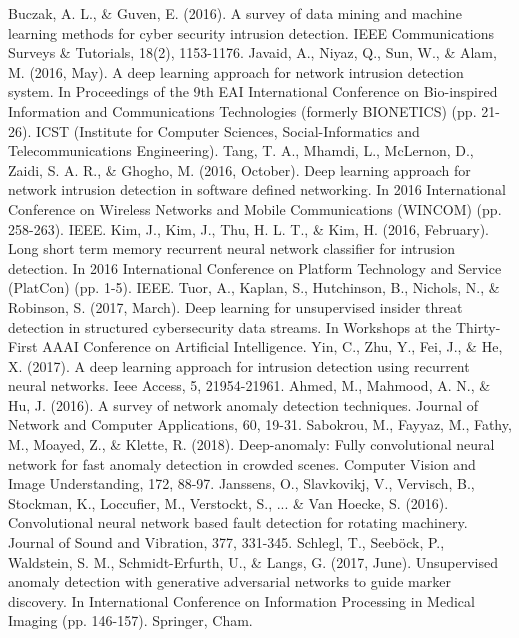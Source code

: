 \documentclass[letterpaper, 10 pt, conference]{ieeeconf}
\begin{document}
\addtolength{\textheight}{-12cm}

\hfill
\begin{thebibliography}{99}

 Buczak, A. L., \& Guven, E. (2016). A survey of data mining and machine learning methods for cyber security intrusion detection. IEEE Communications Surveys \& Tutorials, 18(2), 1153-1176.
 Javaid, A., Niyaz, Q., Sun, W., \& Alam, M. (2016, May). A deep learning approach for network intrusion detection system. In Proceedings of the 9th EAI International Conference on Bio-inspired Information and Communications Technologies (formerly BIONETICS) (pp. 21-26). ICST (Institute for Computer Sciences, Social-Informatics and Telecommunications Engineering).
 Tang, T. A., Mhamdi, L., McLernon, D., Zaidi, S. A. R., \& Ghogho, M. (2016, October). Deep learning approach for network intrusion detection in software defined networking. In 2016 International Conference on Wireless Networks and Mobile Communications (WINCOM) (pp. 258-263). IEEE.
 Kim, J., Kim, J., Thu, H. L. T., \& Kim, H. (2016, February). Long short term memory recurrent neural network classifier for intrusion detection. In 2016 International Conference on Platform Technology and Service (PlatCon) (pp. 1-5). IEEE.
 Tuor, A., Kaplan, S., Hutchinson, B., Nichols, N., \& Robinson, S. (2017, March). Deep learning for unsupervised insider threat detection in structured cybersecurity data streams. In Workshops at the Thirty-First AAAI Conference on Artificial Intelligence.
 Yin, C., Zhu, Y., Fei, J., \& He, X. (2017). A deep learning approach for intrusion detection using recurrent neural networks. Ieee Access, 5, 21954-21961.
 Ahmed, M., Mahmood, A. N., \& Hu, J. (2016). A survey of network anomaly detection techniques. Journal of Network and Computer Applications, 60, 19-31.
 Sabokrou, M., Fayyaz, M., Fathy, M., Moayed, Z., \& Klette, R. (2018). Deep-anomaly: Fully convolutional neural network for fast anomaly detection in crowded scenes. Computer Vision and Image Understanding, 172, 88-97.
 Janssens, O., Slavkovikj, V., Vervisch, B., Stockman, K., Loccufier, M., Verstockt, S., ... \& Van Hoecke, S. (2016). Convolutional neural network based fault detection for rotating machinery. Journal of Sound and Vibration, 377, 331-345.
 Schlegl, T., Seeböck, P., Waldstein, S. M., Schmidt-Erfurth, U., \& Langs, G. (2017, June). Unsupervised anomaly detection with generative adversarial networks to guide marker discovery. In International Conference on Information Processing in Medical Imaging (pp. 146-157). Springer, Cham.

\end{thebibliography}
\end{document}
